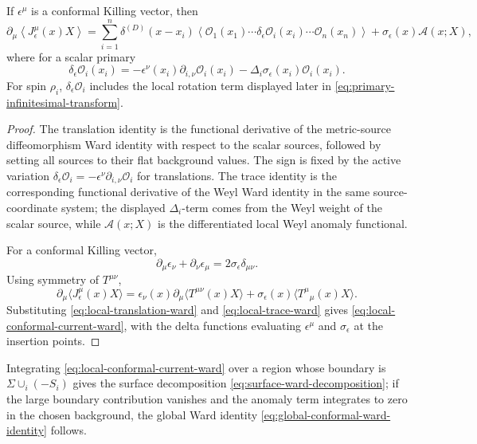 \begin{proposition}
If \(\epsilon^\mu\) is a conformal Killing vector, then
\begin{equation}
  \partial_\mu
  \left\langle J^\mu_\epsilon(x)X\right\rangle
  =
  \sum_{i=1}^n
  \delta^{(D)}(x-x_i)
  \left\langle
    \mathcal O_1(x_1)\cdots
    \delta_\epsilon\mathcal O_i(x_i)\cdots
    \mathcal O_n(x_n)
  \right\rangle
  +
  \sigma_\epsilon(x)\mathcal A(x;X),
  \label{eq:local-conformal-current-ward}
\end{equation}
where for a scalar primary
\[
  \delta_\epsilon\mathcal O_i(x_i)
  =
  -\epsilon^\nu(x_i)\partial_{i,\nu}\mathcal O_i(x_i)
  -\Delta_i\sigma_\epsilon(x_i)\mathcal O_i(x_i).
\]
For spin \(\rho_i\), \(\delta_\epsilon\mathcal O_i\) includes the local
rotation term displayed later in
\eqref{eq:primary-infinitesimal-transform}.
\end{proposition}

\begin{proof}
The translation identity is the functional derivative of the metric-source
diffeomorphism Ward identity with respect to the scalar sources, followed by
setting all sources to their flat background values.  The sign is fixed by the
active variation
\(\delta_\epsilon\mathcal O_i=-\epsilon^\nu\partial_{i,\nu}\mathcal O_i\)
for translations.  The trace identity is the corresponding functional
derivative of the Weyl Ward identity in the same source-coordinate system; the displayed
\(\Delta_i\)-term comes from the Weyl weight of the scalar source, while
\(\mathcal A(x;X)\) is the differentiated local Weyl anomaly functional.

For a conformal Killing vector,
\[
  \partial_\mu\epsilon_\nu+\partial_\nu\epsilon_\mu
  =
  2\sigma_\epsilon\delta_{\mu\nu}.
\]
Using symmetry of \(T^{\mu\nu}\),
\[
  \partial_\mu\langle J^\mu_\epsilon(x)X\rangle
  =
  \epsilon_\nu(x)\partial_\mu
  \langle T^{\mu\nu}(x)X\rangle
  +
  \sigma_\epsilon(x)
  \langle T^\mu{}_\mu(x)X\rangle .
\]
Substituting \eqref{eq:local-translation-ward} and
\eqref{eq:local-trace-ward} gives
\eqref{eq:local-conformal-current-ward}, with the delta functions evaluating
\(\epsilon^\mu\) and \(\sigma_\epsilon\) at the insertion points.
\end{proof}

Integrating
\eqref{eq:local-conformal-current-ward} over a region whose boundary is
\(\Sigma\cup_i(-S_i)\) gives the surface decomposition
\eqref{eq:surface-ward-decomposition}; if the large boundary contribution
vanishes and the anomaly term integrates to zero in the chosen background, the
global Ward identity \eqref{eq:global-conformal-ward-identity} follows.

